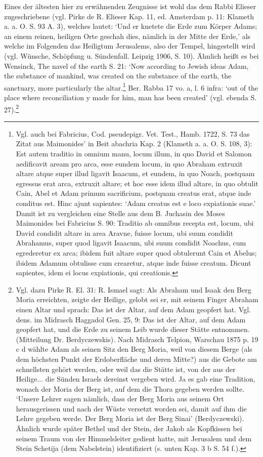 \documentclass[a4paper, 11pt, oneside]{article}
\begin{document}
Eines der ältesten hier zu erwähnenden Zeugnisse ist wohl das dem Rabbi Elieser zugeschriebene (vgl. Pirke de R. Elieser Kap. 11, ed. Amsterdam p. 11: Klameth a. a. O. S. 93 A. 3), welches lautet: `Und er knetete die Erde zum Körper Adams; an einem reinen, heiligen Orte geschah dies, nämlich in der Mitte der Erde,' als welche im Folgenden das Heiligtum Jerusalems, also der Tempel, hingestellt wird (vgl. Wünsche, Schöpfung u. Sündenfall. Leipzig 1906, S. 10). Ähnlich heißt es bei Wensinck, The navel of the earth S. 21: `Now according to Jewish ideas Adam, the substance of mankind, was created on the substance of the earth, the sanctuary, more particularly the altar.\footnote{Vgl. auch bei Fabricius, Cod. pseudepigr. Vet. Test., Hamb. 1722, S. 73 das Zitat aus Maimonides' in Beit abachria Kap. 2 (Klameth a. a. O. S. 108, 3): Est autem traditio in omnium manu, locum illum, in quo David et Salomon aedificavit aream pro arca, esse eundem locum, in quo Abraham extruxit altare atque super illud ligavit Isaacum, et eundem, in quo Noach, postquam egressus erat arca, extruxit altare; et hoc esse idem illud altare, in quo obtulit Cain, Abel et Adam primum sacrificium, postquam creatus erat, atque inde conditus est. Hinc ajunt sapientes: `Adam creatus est e loco expiationis suae.' Damit ist zu vergleichen eine Stelle aus dem B. Juchasin des Moses Maimonides bei Fabricius S. 90: Traditio ab omnibus recepta est, locum, ubi David condidit altare in area Aravne, fuisse locum, ubi suum condidit Abrahamus, super quod ligavit Isaacum, ubi suum condidit Noachus, cum egrederetur ex arca; ibidem fuit altare super quod obtulerunt Cain et Abelus; ibidem Adamum obtulisse cum crearetur, atque inde fuisse creatum. Dicunt sapientes, idem ei locus expiationis, qui creationis.} Ber. Rabba 17 vo. a, l. 6 infra: `out of the place where reconciliation y made for him, man has been created' (vgl. ebenda S. 27).\footnote{Vgl. dazu Pirke R. El. 31: R. Ismael sagt: Als Abraham und Isaak den Berg Moria erreichten, zeigte der Heilige, gelobt sei er, mit seinem Finger Abraham einen Altar und sprach: Das ist der Altar, auf dem Adam geopfert hat. Vgl. dens. im Midrasch Haggadol Gen. 25, 9: Das ist der Altar, auf dem Adam geopfert hat, und die Erde zu seinem Leib wurde dieser Stätte entnommen. (Mitteilung Dr. Berdyczewskis). Nach Midrasch Telpion, Warschau 1875 p. 19 c d wählte Adam als seinen Sitz den Berg Moria, weil von diesem Berge (als dem höchsten Punkt der Erdoberfläche und deren Mitte?) aus die Gebote am schnellsten gehört werden, oder weil das die Stätte ist, von der aus der Heilige... die Sünden Israels dereinst vergeben wird. Ja es gab eine Tradition, wonach der Moria der Berg ist, auf dem die Thora gegeben werden sollte. `Unsere Lehrer sagen nämlich, dass der Berg Moria aus seinem Ort herausgerissen und nach der Wüste versetzt worden sei, damit auf ihm die Lehre gegeben werde. Der Berg Moria ist der Berg Sinai' (Berdyczewski). Ähnlich wurde später Bethel und der Stein, der Jakob als Kopfkissen bei seinem Traum von der Himmelsleiter gedient hatte, mit Jerusalem und dem Stein Schetija (dem Nabelstein) identifiziert (s. unten Kap. 3 b S. 54 f.).}
\end{document}
